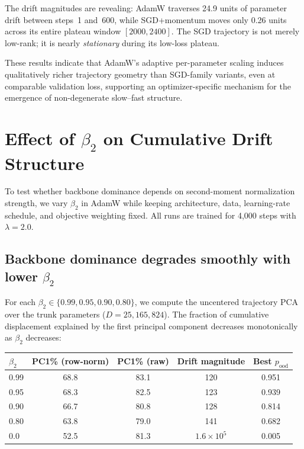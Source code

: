 \documentclass[11pt,a4paper]{article}
\begin{document}
The drift magnitudes are revealing: AdamW traverses 24.9 units of parameter
drift between steps~1 and~600, while SGD+momentum moves only 0.26 units
across its entire plateau window $[2000, 2400]$.  The SGD trajectory is not
merely low-rank; it is nearly \emph{stationary} during its low-loss plateau.

These results indicate that AdamW's adaptive per-parameter scaling induces
qualitatively richer trajectory geometry than SGD-family variants, even at
comparable validation loss, supporting an optimizer-specific mechanism for the
emergence of non-degenerate slow--fast structure.


\section{Effect of $\beta_2$ on Cumulative Drift Structure}\label{sec:beta2}

To test whether backbone dominance depends on second-moment normalization
strength, we vary $\beta_2$ in AdamW while keeping architecture, data,
learning-rate schedule, and objective weighting fixed.  All runs are trained
for 4{,}000 steps with $\lambda = 2.0$.

\subsection{Backbone dominance degrades smoothly with lower $\beta_2$}

For each $\beta_2 \in \{0.99, 0.95, 0.90, 0.80\}$, we compute the uncentered
trajectory PCA over the trunk parameters ($D = 25{,}165{,}824$).  The fraction
of cumulative displacement explained by the first principal component decreases
monotonically as $\beta_2$ decreases:

\begin{center}
\begin{tabular}{lcccc}
\toprule
$\beta_2$ & PC1\% (row-norm) & PC1\% (raw) & Drift magnitude
    & Best $p_{\mathrm{ood}}$ \\
\midrule
0.99 & 68.8 & 83.1 & 120 & 0.951 \\
0.95 & 68.3 & 82.5 & 123 & 0.939 \\
0.90 & 66.7 & 80.8 & 128 & 0.814 \\
0.80 & 63.8 & 79.0 & 141 & 0.682 \\
0.0  & 52.5 & 81.3 & $1.6 \times 10^5$ & 0.005 \\
\bottomrule
\end{tabular}
\end{center}
\end{document}
